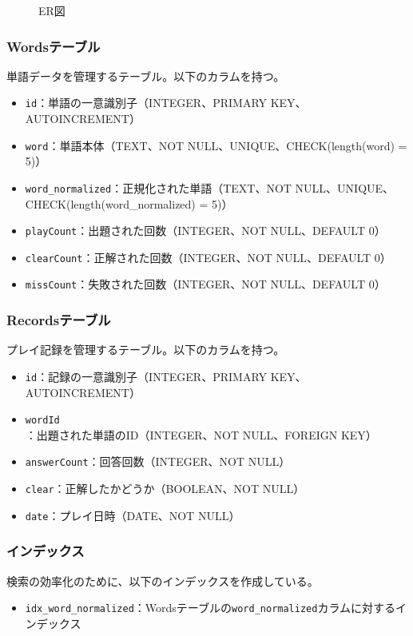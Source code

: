 \documentclass[a4j]{ujarticle}
\begin{document}
\begin{figure}[h]
\centering
\caption{ER図}
\label{fig:er}
\end{figure}

\subsubsection{Wordsテーブル}
単語データを管理するテーブル。以下のカラムを持つ。
\begin{itemize}
  \item \texttt{id}：単語の一意識別子（INTEGER、PRIMARY KEY、AUTOINCREMENT）
  \item \texttt{word}：単語本体（TEXT、NOT NULL、UNIQUE、CHECK(length(word) = 5)）
  \item \texttt{word\_normalized}：正規化された単語（TEXT、NOT NULL、UNIQUE、CHECK(length(word\_normalized) = 5)）
  \item \texttt{playCount}：出題された回数（INTEGER、NOT NULL、DEFAULT 0）
  \item \texttt{clearCount}：正解された回数（INTEGER、NOT NULL、DEFAULT 0）
  \item \texttt{missCount}：失敗された回数（INTEGER、NOT NULL、DEFAULT 0）
\end{itemize}

\subsubsection{Recordsテーブル}
プレイ記録を管理するテーブル。以下のカラムを持つ。
\begin{itemize}
  \item \texttt{id}：記録の一意識別子（INTEGER、PRIMARY KEY、AUTOINCREMENT）
  \item \texttt{wordId}：出題された単語のID（INTEGER、NOT NULL、FOREIGN KEY）
  \item \texttt{answerCount}：回答回数（INTEGER、NOT NULL）
  \item \texttt{clear}：正解したかどうか（BOOLEAN、NOT NULL）
  \item \texttt{date}：プレイ日時（DATE、NOT NULL）
\end{itemize}

\subsubsection{インデックス}
検索の効率化のために、以下のインデックスを作成している。
\begin{itemize}
  \item \texttt{idx\_word\_normalized}：Wordsテーブルの\texttt{word\_normalized}カラムに対するインデックス
\end{itemize}
\end{document}
